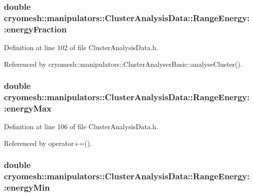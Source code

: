\hypertarget{structcryomesh_1_1manipulators_1_1ClusterAnalysisData_1_1RangeEnergy_a5b00be235f5ec97fc564a87b7a53e15f}{
\subsubsection[{energy\-Fraction}]{\setlength{\rightskip}{0pt plus 5cm}double {\bf cryomesh\-::manipulators\-::\-Cluster\-Analysis\-Data\-::\-Range\-Energy\-::energy\-Fraction}}}\label{structcryomesh_1_1manipulators_1_1ClusterAnalysisData_1_1RangeEnergy_a5b00be235f5ec97fc564a87b7a53e15f}


\-Definition at line 102 of file \-Cluster\-Analysis\-Data.\-h.



\-Referenced by cryomesh\-::manipulators\-::\-Cluster\-Analyser\-Basic\-::analyse\-Cluster().

\hypertarget{structcryomesh_1_1manipulators_1_1ClusterAnalysisData_1_1RangeEnergy_a51770c52465ceb02f9d452a46bedff77}{
\subsubsection[{energy\-Max}]{\setlength{\rightskip}{0pt plus 5cm}double {\bf cryomesh\-::manipulators\-::\-Cluster\-Analysis\-Data\-::\-Range\-Energy\-::energy\-Max}}}\label{structcryomesh_1_1manipulators_1_1ClusterAnalysisData_1_1RangeEnergy_a51770c52465ceb02f9d452a46bedff77}


\-Definition at line 106 of file \-Cluster\-Analysis\-Data.\-h.



\-Referenced by operator+=().

\hypertarget{structcryomesh_1_1manipulators_1_1ClusterAnalysisData_1_1RangeEnergy_aca92fb70884ff9717e530d91130d5e8d}{
\subsubsection[{energy\-Min}]{\setlength{\rightskip}{0pt plus 5cm}double {\bf cryomesh\-::manipulators\-::\-Cluster\-Analysis\-Data\-::\-Range\-Energy\-::energy\-Min}}}\label{structcryomesh_1_1manipulators_1_1ClusterAnalysisData_1_1RangeEnergy_aca92fb70884ff9717e530d91130d5e8d}



